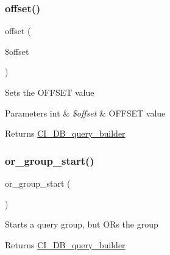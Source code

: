 \subsubsection{\texorpdfstring{offset()}{offset()}}
{\footnotesize\ttfamily offset (\begin{DoxyParamCaption}\item[{}]{\$offset }\end{DoxyParamCaption})}

Sets the O\+F\+F\+S\+ET value


\begin{DoxyParams}[1]{Parameters}
int & {\em \$offset} & O\+F\+F\+S\+ET value \\
\hline
\end{DoxyParams}
\begin{DoxyReturn}{Returns}
\mbox{\hyperlink{class_c_i___d_b__query__builder}{C\+I\+\_\+\+D\+B\+\_\+query\+\_\+builder}} 
\end{DoxyReturn}
\mbox{\label{class_c_i___d_b__query__builder_a80d5e4a0d8f2d0f202e8df6816865838}} 
\subsubsection{\texorpdfstring{or\+\_\+group\+\_\+start()}{or\_group\_start()}}
{\footnotesize\ttfamily or\+\_\+group\+\_\+start (\begin{DoxyParamCaption}{ }\end{DoxyParamCaption})}

Starts a query group, but O\+Rs the group

\begin{DoxyReturn}{Returns}
\mbox{\hyperlink{class_c_i___d_b__query__builder}{C\+I\+\_\+\+D\+B\+\_\+query\+\_\+builder}} 
\end{DoxyReturn}
\mbox{\label{class_c_i___d_b__query__builder_a14528cda8dcca86ebb9b597d9c8d1c14}} 
